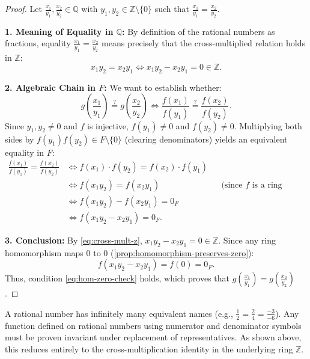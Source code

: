 \begin{content}

\begin{proof}
Let $\frac{x_1}{y_1}, \frac{x_2}{y_2} \in \mathbb{Q}$ with $y_1, y_2 \in \mathbb{Z} \setminus \{0\}$ such that $\frac{x_1}{y_1} = \frac{x_2}{y_2}$.

\textbf{1. Meaning of Equality in $\mathbb{Q}$:}
By definition of the rational numbers as fractions, equality $\frac{x_1}{y_1} = \frac{x_2}{y_2}$ means precisely that the cross-multiplied relation holds in $\mathbb{Z}$:
\begin{equation}\label{eq:cross-mult-z}
x_1 y_2 = x_2 y_1 \iff x_1 y_2 - x_2 y_1 = 0 \in \mathbb{Z}.
\end{equation}

\textbf{2. Algebraic Chain in $F$:}
We want to establish whether:
\[
g\left(\frac{x_1}{y_1}\right) \overset{?}{=} g\left(\frac{x_2}{y_2}\right) \iff \frac{f(x_1)}{f(y_1)} \overset{?}{=} \frac{f(x_2)}{f(y_2)}.
\]
Since $y_1, y_2 \ne 0$ and $f$ is injective, $f(y_1) \ne 0$ and $f(y_2) \ne 0$. Multiplying both sides by $f(y_1)f(y_2) \in F \setminus \{0\}$ (clearing denominators) yields an equivalent equality in $F$:
\begin{align}
\frac{f(x_1)}{f(y_1)} = \frac{f(x_2)}{f(y_2)} &\iff f(x_1) \cdot f(y_2) = f(x_2) \cdot f(y_1) \nonumber \\
&\iff f(x_1 y_2) = f(x_2 y_1) && \text{(since $f$ is a ring homomorphism)} \nonumber \\
&\iff f(x_1 y_2) - f(x_2 y_1) = 0_F \nonumber \\
&\iff f(x_1 y_2 - x_2 y_1) = 0_F. \label{eq:hom-zero-check}
\end{align}

\textbf{3. Conclusion:}
By \eqref{eq:cross-mult-z}, $x_1 y_2 - x_2 y_1 = 0 \in \mathbb{Z}$. Since any ring homomorphism maps $0$ to $0$ (\cref{prop:homomorphism-preserves-zero}):
\[
f(x_1 y_2 - x_2 y_1) = f(0) = 0_F.
\]
Thus, condition \eqref{eq:hom-zero-check} holds, which proves that $g\left(\frac{x_1}{y_1}\right) = g\left(\frac{x_2}{y_2}\right)$.
\end{proof}

\begin{steps}
A rational number has infinitely many equivalent names (e.g., $\frac{1}{2} = \frac{2}{4} = \frac{-3}{-6}$). Any function defined on rational numbers using numerator and denominator symbols must be proven invariant under replacement of representatives. As shown above, this reduces entirely to the cross-multiplication identity in the underlying ring $\mathbb{Z}$.
\end{steps}
\end{content}

